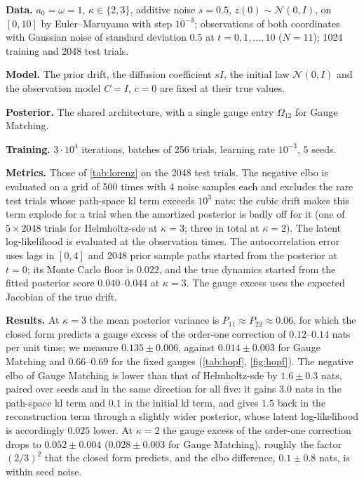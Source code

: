 \documentclass{article} %
\newcommand{\gauge}{\Omega}
\newcommand{\Norm}{\mathcal{N}}
\begin{document}
\textbf{Data.} $a_0 = \omega = 1$, $\kappa \in \{2, 3\}$, additive noise $s = 0.5$, $z(0) \sim \Norm(0, I)$, on $[0, 10]$ by Euler--Maruyama with step $10^{-3}$; observations of both coordinates with Gaussian noise of standard deviation $0.5$ at $t = 0, 1, \ldots, 10$ ($N = 11$); 1024 training and 2048 test trials.

\textbf{Model.} The prior drift, the diffusion coefficient $s I$, the initial law $\Norm(0, I)$ and the observation model $C = I$, $c = 0$ are fixed at their true values.

\textbf{Posterior.} The shared architecture, with a single gauge entry $\gauge_{12}$ for Gauge Matching.

\textbf{Training.} $3 \cdot 10^4$ iterations, batches of 256 trials, learning rate $10^{-3}$, 5 seeds.

\textbf{Metrics.} Those of \cref{tab:lorenz} on the 2048 test trials. The negative \gls{elbo} is evaluated on a grid of 500 times with 4 noise samples each and excludes the rare test trials whose path-space \gls{kl} term exceeds $10^3$ nats: the cubic drift makes this term explode for a trial when the amortized posterior is badly off for it (one of $5 \times 2048$ trials for Helmholtz-\gls{sde} at $\kappa = 3$; three in total at $\kappa = 2$). The latent log-likelihood is evaluated at the observation times. The autocorrelation error uses lags in $[0, 4]$ and 2048 prior sample paths started from the posterior at $t = 0$; its Monte Carlo floor is $0.022$, and the true dynamics started from the fitted posterior score $0.040$--$0.044$ at $\kappa = 3$. The gauge excess uses the expected Jacobian of the true drift.

\textbf{Results.} At $\kappa = 3$ the mean posterior variance is $P_{11} \approx P_{22} \approx 0.06$, for which the closed form predicts a gauge excess of the order-one correction of $0.12$--$0.14$ nats per unit time; we measure $0.135 \pm 0.006$, against $0.014 \pm 0.003$ for Gauge Matching and $0.66$--$0.69$ for the fixed gauges (\cref{tab:hopf}, \cref{fig:hopf}). The negative \gls{elbo} of Gauge Matching is lower than that of Helmholtz-\gls{sde} by $1.6 \pm 0.3$ nats, paired over seeds and in the same direction for all five: it gains $3.0$ nats in the path-space \gls{kl} term and $0.1$ in the initial \gls{kl} term, and gives $1.5$ back in the reconstruction term through a slightly wider posterior, whose latent log-likelihood is accordingly $0.025$ lower. At $\kappa = 2$ the gauge excess of the order-one correction drops to $0.052 \pm 0.004$ ($0.028 \pm 0.003$ for Gauge Matching), roughly the factor $(2/3)^2$ that the closed form predicts, and the \gls{elbo} difference, $0.1 \pm 0.8$ nats, is within seed noise.
\end{document}
